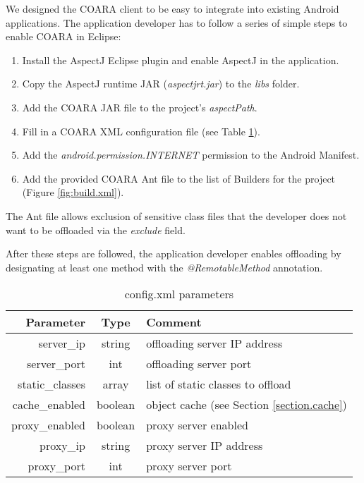\documentclass[10pt,journal,cspaper,compsoc]{IEEEtran}
\begin{document}
{We designed the COARA client to be easy to integrate into existing Android applications.  The application developer has to follow a series of simple steps to enable COARA in Eclipse:


\begin{enumerate}[noitemsep]
  \item Install the AspectJ Eclipse plugin and enable AspectJ in the application.
  \item Copy the AspectJ runtime JAR (\emph{aspectjrt.jar}) to the \emph{libs} folder.
  \item Add the COARA JAR file to the project's \emph{aspectPath}.
  \item Fill in a COARA XML configuration file (see Table \ref{table:config}).
  \item Add the \emph{android.permission.INTERNET} permission to the Android Manifest.
  \item Add the provided COARA Ant file to the list of Builders for the project (Figure \ref{fig:build.xml}).
\end{enumerate}

The Ant file allows exclusion of sensitive class files that the developer does not want to be offloaded via the \emph{exclude} field.

After these steps are followed, the application developer enables offloading by designating at least one method with the \emph{@RemotableMethod} annotation.

\begin{table}
\centering
\caption{config.xml parameters\label{table:config}}
\begin{tabular}{|r|c|p{4.5cm}|} \hline
\textbf{Parameter}&\textbf{Type}&\textbf{Comment}\\ \hline
server\_ip&string&offloading server IP address\\ \hline
server\_port&int&offloading server port\\ \hline
static\_classes&array&list of static classes to offload \\ \hline
cache\_enabled&boolean&object cache (see Section \ref{section.cache}) \\ \hline
proxy\_enabled&boolean&proxy server enabled\\ \hline
proxy\_ip&string&proxy server IP address\\ \hline
proxy\_port&int&proxy server port\\
\hline\end{tabular}
\end{table}

}
\end{document}
